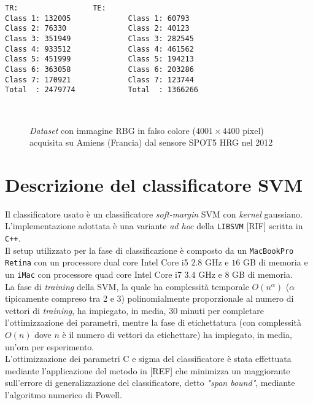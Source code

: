 \begin{lstlisting}[float=b,title={Distribuzione dei pixel di training(TR) e test(TS) classe per classe.},
                   label=lst:esempio, frame=lines]
TR:					TE:
Class 1: 132005				Class 1: 60793
Class 2: 76330				Class 2: 40123
Class 3: 351949				Class 3: 282545
Class 4: 933512				Class 4: 461562
Class 5: 451999				Class 5: 194213
Class 6: 363058				Class 6: 203286
Class 7: 170921				Class 7: 123744
Total  : 2479774			Total  : 1366266
\end{lstlisting}
\clearpage

\begin{figure}[!ht]
   \center
   \\%
     \hspace{4mm}
    \caption{\emph{Dataset} con immagine RBG in falso colore ($4001\times4400$ pixel) acquisita su Amiens (Francia) dal sensore \textsc{SPOT5 HRG} nel 2012}
    \label{fig: Amiens122_5m}
  \end{figure}
\clearpage

\section{Descrizione del classificatore SVM}
Il classificatore usato è un classificatore \emph{soft-margin} SVM con \emph{kernel} gaussiano. L'implementazione adottata è una variante \emph{ad hoc} della \texttt{LIBSVM} [RIF] scritta in \texttt{C++}.\\
Il setup utilizzato per la fase di classificazione è composto da un \texttt{MacBookPro Retina} con un processore dual core Intel Core i5 $2.8$ GHz e $16$ GB di memoria e un \texttt{iMac} con processore quad core Intel Core i7 $3.4$ GHz e $8$ GB di memoria. \\

La fase di \emph{training} della SVM, la quale ha complessità temporale $O(n^\alpha)$ ($\alpha$ tipicamente compreso tra 2 e 3) polinomialmente proporzionale al numero di vettori di \emph{training}, ha impiegato, in media, 30 minuti per completare l'ottimizzazione dei parametri, mentre la fase di etichettatura (con complessità $O(n)$ dove $n$ è il numero di vettori da etichettare) ha impiegato, in media, un'ora per esperimento.\\
L'ottimizzazione dei parametri C e sigma del classificatore è stata effettuata mediante l'applicazione del metodo in [REF] che minimizza un maggiorante sull'errore di generalizzazione del classificatore, detto \emph{"span bound"}, mediante l'algoritmo numerico di Powell.



